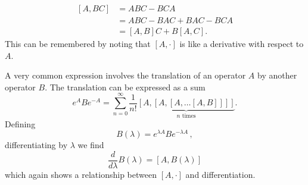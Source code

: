 

\begin{align}
  \left[A,BC\right] &= ABC - BCA \nonumber \\
  & = ABC - BAC + BAC - BCA \nonumber \\
  & = [A,B]C + B[A,C].
\end{align}
This can be remembered by noting that $[A,\cdot]$ is like a derivative with respect to $A$.


A very common expression involves the translation of an operator $A$ by another operator $B$.
The translation can be expressed as a sum
\begin{equation}
  e^{A}Be^{-A}=\sum_{n=0}^{\infty}\frac{1}{n!}\underbrace{[A,[A,[A,\ldots[A,B]]]]}_{n\textrm{ times}}. \label{eq:translationSum}
\end{equation}
Defining
\begin{equation}
  B(\lambda) = e^{\lambda A} B e^{-\lambda A}
  \, ,
\end{equation}
differentiating by $\lambda$ we find
\begin{equation}
  \frac{d}{d\lambda}B(\lambda) = [A, B(\lambda)] \label{eq:translation_diff_eq}  %
\end{equation}
which again shows a relationship between $[A, \cdot]$ and differentiation.


